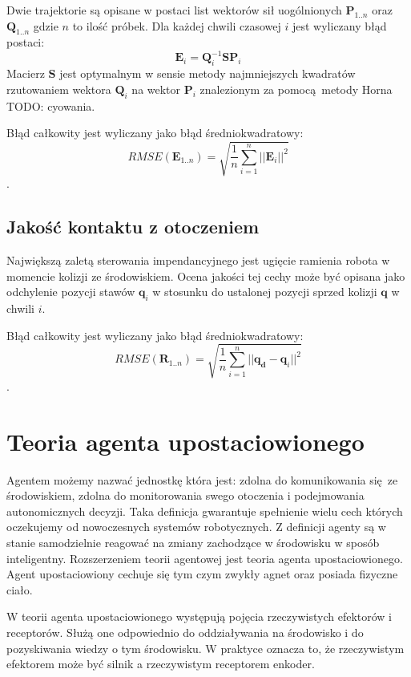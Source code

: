 Dwie trajektorie są opisane w postaci list wektorów sił uogólnionych $\boldsymbol{P}_{1..n}$ oraz $\boldsymbol{Q}_{1..n}$ gdzie $n$ to ilość próbek. Dla każdej chwili czasowej $i$ jest wyliczany błąd postaci:
\begin{equation}
\boldsymbol{E}_i = \boldsymbol{Q}_i^{-1}\boldsymbol{S}\boldsymbol{P}_i
\end{equation}
Macierz $\boldsymbol{S}$ jest optymalnym w sensie metody najmniejszych kwadratów rzutowaniem wektora $\boldsymbol{Q}_i$ na wektor $\boldsymbol{P}_i$ znalezionym za pomocą metody Horna TODO: cyowania. 

Błąd całkowity jest wyliczany jako błąd średniokwadratowy:
\begin{equation}
RMSE(\boldsymbol{E}_{1..n}) = \sqrt{\frac{1}{n}\sum_{i=1}^{n}||\boldsymbol{E}_i||^2}
\end{equation}.

\subsection{Jakość kontaktu z otoczeniem }
Największą zaletą sterowania impendancyjnego jest ugięcie ramienia robota w momencie kolizji ze środowiskiem. Ocena jakości tej cechy może być opisana jako odchylenie pozycji stawów $\boldsymbol{q}_i$ w stosunku do ustalonej pozycji sprzed kolizji $\boldsymbol{q}$ w chwili $i$.


Błąd całkowity jest wyliczany jako błąd średniokwadratowy:
\begin{equation}
RMSE(\boldsymbol{R}_{1..n}) = \sqrt{\frac{1}{n}\sum_{i=1}^{n}||\boldsymbol{q_d}-\boldsymbol{q}_i||^2}
\end{equation}.

\section{Teoria agenta upostaciowionego}
Agentem możemy nazwać jednostkę która jest: zdolna do komunikowania się ze środowiskiem, zdolna do monitorowania swego otoczenia i podejmowania autonomicznych decyzji. Taka definicja gwarantuje spełnienie wielu cech których oczekujemy od nowoczesnych systemów robotycznych. Z definicji agenty są w stanie samodzielnie reagować na zmiany zachodzące w środowisku w sposób inteligentny. Rozszerzeniem teorii agentowej jest teoria agenta upostaciowionego. Agent upostaciowiony cechuje się tym czym zwykły agnet oraz posiada fizyczne ciało.


W teorii agenta upostaciowionego występują pojęcia rzeczywistych efektorów i receptorów. Służą one odpowiednio do oddziaływania na środowisko i do pozyskiwania wiedzy o tym środowisku. W praktyce oznacza to, że rzeczywistym efektorem może być silnik a rzeczywistym receptorem enkoder. 

